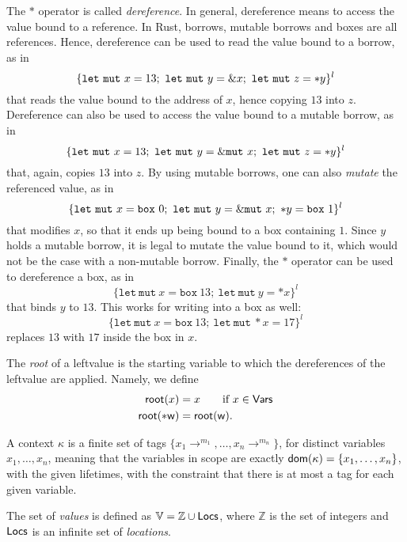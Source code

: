 The $*$ operator is called \emph{dereference}. In general, dereference means to access the
value bound to a reference. In Rust, borrows, mutable borrows and boxes are all references.
Hence, dereference can be used to read the value bound to a borrow, as in
\[
\{
\mathtt{let\ mut}\ x = 13;\
\mathtt{let\ mut}\ y = \& x;\
\mathtt{let\ mut}\ z = \mathtt{*}y
\}^l
\]
that reads the value bound to the address of $x$, hence copying $13$ into $z$.
Dereference can also be used to access the value bound to a mutable borrow, as in
\[
\{
\mathtt{let\ mut}\ x = 13;\
\mathtt{let\ mut}\ y = \&\mathtt{mut}\  x;\
\mathtt{let\ mut}\ z = \mathtt{*}y
\}^l
\]
that, again, copies $13$ into $z$.
By using mutable borrows, one can also \emph{mutate} the referenced value, as in
\[
\{
\mathtt{let\ mut}\ x = \mathtt{box}\ 0;\
\mathtt{let\ mut}\ y = \&\mathtt{mut}\  x;\
\mathtt{*}y = \mathtt{box}\ 1
\}^l
\]
that modifies $x$, so that it ends up being bound to a box containing $1$. Since $y$ holds a mutable borrow,
it is legal to mutate the value bound to it, which would not be the case with a non-mutable borrow.
Finally, the $*$ operator can be used to dereference a box, as in
\[
\{
\mathtt{let\ mut}\ x = \mathtt{box}\ 13;\
\mathtt{let\ mut}\ y = *x
\}^l
\]
that binds $y$ to $13$. This works for writing into a box as well:
\[
\{
\mathtt{let\ mut}\ x = \mathtt{box}\ 13;\
\mathtt{let\ mut}\ *x = 17
\}^l
\]
replaces $13$ with $17$ inside the box in $x$.

\begin{definition}\label{def:root}
  The \emph{root} of a leftvalue is the starting variable to which the dereferences of the
  leftvalue are applied. Namely, we define
  \begin{align*}
    \mathsf{root}(x) &= x\qquad\text{if $x\in\mathsf{Vars}$}\\
    \mathsf{root}(\mathtt{*}\mathsf{w}) &= \mathsf{root}(\mathsf{w}).
  \end{align*}
\end{definition}

\begin{definition}[Context]\label{def:context}
  A context $\kappa$ is a finite set of tags $\{x_1\to^{m_1},\ldots,x_n\to^{m_n}\}$,
  for distinct variables $x_1,\ldots,x_n$,
  meaning that the variables in scope are exactly
  $\mathsf{dom}(\kappa)=\{x_1,\ldots,x_n\}$, with the given lifetimes,
  with the constraint that there is at most a tag for each
  given variable.
\end{definition}

\begin{definition}[Values]\label{def:values}
  The set of \emph{values} is defined as $\mathbb{V}=\mathbb{Z}\cup\mathsf{Locs}$,
  where $\mathbb{Z}$ is the set of integers and
  $\mathsf{Locs}$ is an infinite set of \emph{locations}.
\end{definition}

